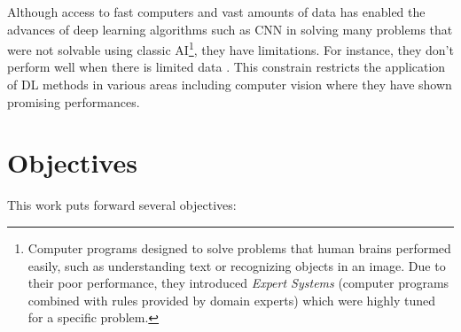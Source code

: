 Although access to fast computers and vast amounts of data has enabled the advances of deep learning algorithms such as CNN in solving many problems that were not solvable using classic AI\footnote{Computer programs designed to solve problems that human brains performed easily, such as understanding text or recognizing objects in an image. Due to their poor performance, they introduced \textit{Expert Systems} (computer programs combined with rules provided by domain experts) which were highly tuned for a specific problem. }, they have limitations. For instance, they don't perform well when there is limited data \cite{griffin2007caltech}. This constrain restricts the application of DL methods in various areas including computer vision where they have shown promising performances.  


\section{Objectives}
This work puts forward several objectives:
